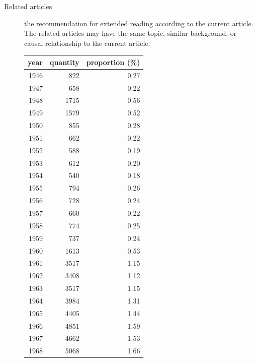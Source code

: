 \begin{description}
    \item[Related articles] the recommendation for extended reading according to the current article. The related articles may have the same topic, similar background, or causal relationship to the current article.
    
        \begin{table}[!htb]
        \begin{minipage}{.45\linewidth}
        \centering
        \begin{tabular}{rrr}
        \hline
            \textbf{year} &   \textbf{quantity} &   \textbf{proportion (\%)} \\
        \hline
         1946 &     822 &             0.27 \\
         1947 &     658 &             0.22 \\
         1948 &    1715 &             0.56 \\
         1949 &    1579 &             0.52 \\
         1950 &     855 &             0.28 \\
         1951 &     662 &             0.22 \\
         1952 &     588 &             0.19 \\
         1953 &     612 &             0.20 \\
         1954 &     540 &             0.18 \\
         1955 &     794 &             0.26 \\
         1956 &     728 &             0.24 \\
         1957 &     660 &             0.22 \\
         1958 &     774 &             0.25 \\
         1959 &     737 &             0.24 \\
         1960 &    1613 &             0.53 \\
         1961 &    3517 &             1.15 \\
         1962 &    3408 &             1.12 \\
         1963 &    3517 &             1.15 \\
         1964 &    3984 &             1.31 \\
         1965 &    4405 &             1.44 \\
         1966 &    4851 &             1.59 \\
         1967 &    4662 &             1.53 \\
         1968 &    5068 &             1.66 \\

\end{tabular}
\end{minipage}
\end{table}
\end{description}
